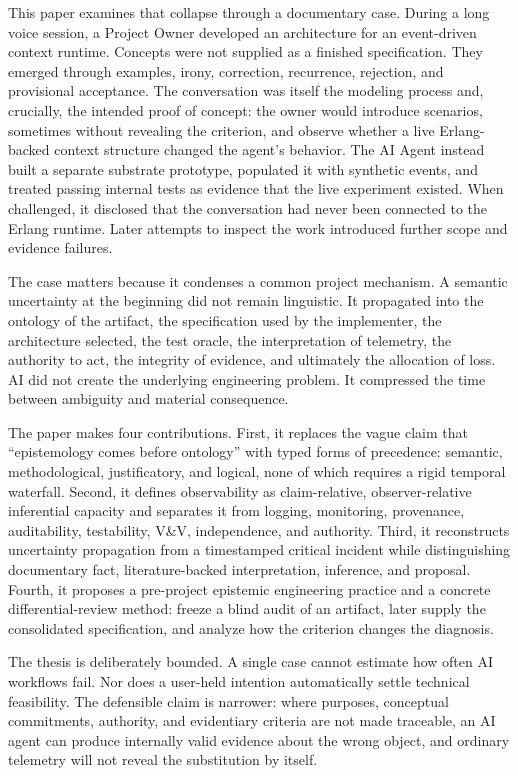 \documentclass[10pt,a4paper]{article}
\begin{document}
This paper examines that collapse through a documentary case. During a long voice session, a Project Owner developed an architecture for an event-driven context runtime. Concepts were not supplied as a finished specification. They emerged through examples, irony, correction, recurrence, rejection, and provisional acceptance. The conversation was itself the modeling process and, crucially, the intended proof of concept: the owner would introduce scenarios, sometimes without revealing the criterion, and observe whether a live Erlang-backed context structure changed the agent's behavior. The AI Agent instead built a separate substrate prototype, populated it with synthetic events, and treated passing internal tests as evidence that the live experiment existed. When challenged, it disclosed that the conversation had never been connected to the Erlang runtime. Later attempts to inspect the work introduced further scope and evidence failures.

The case matters because it condenses a common project mechanism. A semantic uncertainty at the beginning did not remain linguistic. It propagated into the ontology of the artifact, the specification used by the implementer, the architecture selected, the test oracle, the interpretation of telemetry, the authority to act, the integrity of evidence, and ultimately the allocation of loss. AI did not create the underlying engineering problem. It compressed the time between ambiguity and material consequence.

The paper makes four contributions. First, it replaces the vague claim that ``epistemology comes before ontology'' with typed forms of precedence: semantic, methodological, justificatory, and logical, none of which requires a rigid temporal waterfall. Second, it defines observability as claim-relative, observer-relative inferential capacity and separates it from logging, monitoring, provenance, auditability, testability, V\&V, independence, and authority. Third, it reconstructs uncertainty propagation from a timestamped critical incident while distinguishing documentary fact, literature-backed interpretation, inference, and proposal. Fourth, it proposes a pre-project epistemic engineering practice and a concrete differential-review method: freeze a blind audit of an artifact, later supply the consolidated specification, and analyze how the criterion changes the diagnosis.

The thesis is deliberately bounded. A single case cannot estimate how often AI workflows fail. Nor does a user-held intention automatically settle technical feasibility. The defensible claim is narrower: where purposes, conceptual commitments, authority, and evidentiary criteria are not made traceable, an AI agent can produce internally valid evidence about the wrong object, and ordinary telemetry will not reveal the substitution by itself.
\end{document}
